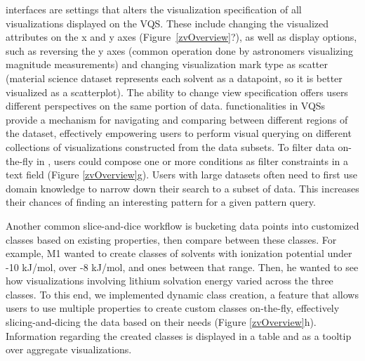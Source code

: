  interfaces are settings that alters the visualization specification of all visualizations displayed on the VQS. These include changing the visualized attributes on the x and y axes (Figure~\ref{zvOverview}?), as well as display options, such as reversing the y axes (common operation done by astronomers visualizing magnitude measurements) and changing visualization mark type as scatter (material science dataset represents each solvent as a datapoint, so it is better visualized as a scatterplot). The ability to change view specification offers users different perspectives on the same portion of data.
 functionalities in VQSs provide a mechanism for navigating and comparing between different regions of the dataset, effectively empowering users to perform visual querying on different collections of visualizations constructed from the data subsets. To filter data on-the-fly in \zv, users could compose one or more conditions as filter constraints in a text field (Figure \ref{zvOverview}g). Users with large datasets often need to first use domain knowledge to narrow down their search to a subset of data. This increases their chances of finding an interesting pattern for a given pattern query.  
\par Another common slice-and-dice workflow is bucketing data points into customized classes based on existing properties, then compare between these classes. For example, M1 wanted to create classes of solvents with ionization potential under -10 kJ/mol, over -8 kJ/mol, and ones between that range. Then, he wanted to see how visualizations involving lithium solvation energy varied across the three classes. To this end, we implemented dynamic class creation, a feature that allows users to use multiple properties to create custom classes on-the-fly, effectively slicing-and-dicing the data based on their needs (Figure \ref{zvOverview}h). Information regarding the created classes is displayed in a table and as a tooltip over aggregate visualizations.
%
